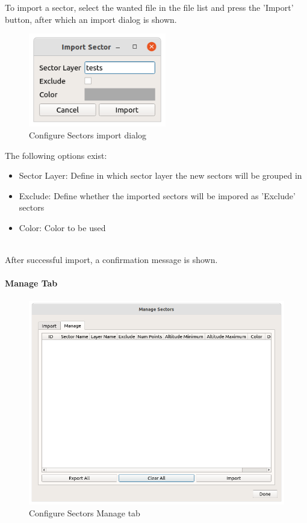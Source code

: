 To import a sector, select the wanted file in the file list and press the 'Import' button, after which an import dialog is shown. \\

\begin{figure}[H]
    \includegraphics[width=6cm]{figures/configure_sectors_import_dialog.png}
  \caption{Configure Sectors import dialog}
\end{figure}

The following options exist:
\begin{itemize}
\item Sector Layer: Define in which sector layer the new sectors will be grouped in
\item Exclude: Define whether the imported sectors will be impored as 'Exclude' sectors
\item Color: Color to be used
\end{itemize}
\ \\

After successful import, a confirmation message is shown. \\

\paragraph {Manage Tab}

\begin{figure}[H]
    \includegraphics[width=15cm]{figures/configure_sectors_manage.png}
  \caption{Configure Sectors Manage tab}
\end{figure}

